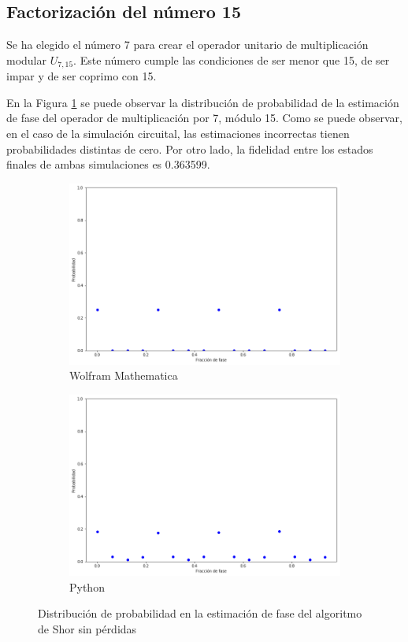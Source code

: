 \subsection{Factorización del número 15}

Se ha elegido el número 7 para crear el operador unitario de multiplicación modular $U_{7,15}$. Este número cumple las condiciones de ser menor que 15, de ser impar y de ser coprimo con 15.

En la Figura \ref{fig:shor15} se puede observar la distribución de probabilidad de la estimación de fase del operador de multiplicación por 7, módulo 15. Como se puede observar, en el caso de la simulación circuital, las estimaciones incorrectas tienen probabilidades distintas de cero. Por otro lado, la fidelidad entre los estados finales de ambas simulaciones es 0.363599.

\begin{figure}[H]
    \centering
    \begin{subfigure}[m]{0.45\textwidth}
        \centering
        \includegraphics[width=0.9\linewidth]{img/ShorM15.png}
        \caption{Wolfram Mathematica}
    \end{subfigure}
    \begin{subfigure}[m]{0.45\textwidth}
        \centering
        \includegraphics[width=0.9\linewidth]{img/shorlossless.png}
        \caption{Python}
    \end{subfigure}
    \caption[Distribución de probabilidad en la estimación de fase del algoritmo de Shor sin pérdidas]{Distribución de probabilidad en la estimación de fase del algoritmo de Shor sin pérdidas}
    \label{fig:shor15}
\end{figure}

